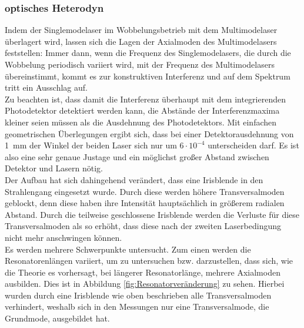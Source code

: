 \documentclass[a4paper,twoside,final]{article}
\begin{document}
\subsubsection{optisches Heterodyn}
Indem der Singlemodelaser im Wobbelungsbetrieb mit dem Multimodelaser überlagert wird, lassen sich die Lagen der Axialmoden des Multimodelasers feststellen: Immer dann, wenn die Frequenz des Singlemodelasers, die durch die Wobbelung periodisch variiert wird, mit der Frequenz des Multimodelasers übereinstimmt, kommt es zur konstruktiven Interferenz und auf dem Spektrum tritt ein Ausschlag auf. \\
Zu beachten ist, dass damit die Interferenz überhaupt mit dem integrierenden Photodetektor detektiert werden kann, die Abstände der Interferenzmaxima kleiner seien müssen als die Ausdehnung des Photodetektors. Mit einfachen geometrischen Überlegungen ergibt sich, dass bei einer Detektorausdehnung von \SI{1}{\milli\meter} der Winkel der beiden Laser sich nur um $6\cdot 10^{-4}$ unterscheiden darf. Es ist also eine sehr genaue Justage und ein möglichst großer Abstand zwischen Detektor und Lasern nötig. \\
Der Aufbau hat sich dahingehend verändert, dass eine Irisblende in den Strahlengang eingesetzt wurde. Durch diese werden höhere Transversalmoden geblockt, denn diese haben ihre Intensität hauptsächlich in größerem radialen Abstand. Durch die teilweise geschlossene Irisblende werden die Verluste für diese Transversalmoden als so erhöht, dass diese nach der zweiten Laserbedingung nicht mehr anschwingen können. \\
Es werden mehrere Schwerpunkte untersucht. Zum einen werden die Resonatorenlängen variiert, um zu untersuchen bzw. darzustellen, dass sich, wie die Theorie es vorhersagt, bei längerer Resonatorlänge, mehrere Axialmoden ausbilden. Dies ist in Abbildung \ref{fig:Resonatorveränderung} zu sehen. Hierbei wurden durch eine Irisblende wie oben beschrieben alle Transversalmoden verhindert, weshalb sich in den Messungen nur eine Transversalmode, die Grundmode, ausgebildet hat.
\end{document}
